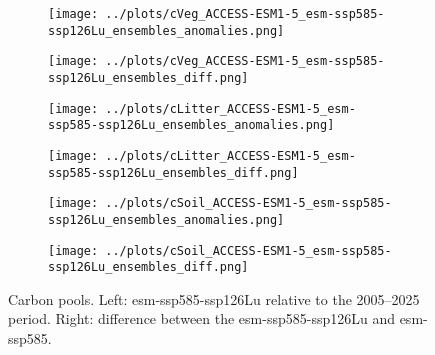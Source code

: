 \documentclass[]{article}
\begin{document}
\begin{figure}[H]
    \centering
    \begin{subfigure}[b]{0.4\linewidth}
        \texttt{[image: ../plots/cVeg\_ACCESS-ESM1-5\_esm-ssp585-ssp126Lu\_ensembles\_anomalies.png]}
    \end{subfigure}
    \begin{subfigure}[b]{0.4\linewidth}
        \texttt{[image: ../plots/cVeg\_ACCESS-ESM1-5\_esm-ssp585-ssp126Lu\_ensembles\_diff.png]}
    \end{subfigure}
    \begin{subfigure}[b]{0.4\linewidth}
        \texttt{[image: ../plots/cLitter\_ACCESS-ESM1-5\_esm-ssp585-ssp126Lu\_ensembles\_anomalies.png]}
    \end{subfigure}
    \begin{subfigure}[b]{0.4\linewidth}
        \texttt{[image: ../plots/cLitter\_ACCESS-ESM1-5\_esm-ssp585-ssp126Lu\_ensembles\_diff.png]}
    \end{subfigure}
    \begin{subfigure}[b]{0.4\linewidth}
        \texttt{[image: ../plots/cSoil\_ACCESS-ESM1-5\_esm-ssp585-ssp126Lu\_ensembles\_anomalies.png]}
    \end{subfigure}
    \begin{subfigure}[b]{0.4\linewidth}
        \texttt{[image: ../plots/cSoil\_ACCESS-ESM1-5\_esm-ssp585-ssp126Lu\_ensembles\_diff.png]}
    \end{subfigure}
    \caption{Carbon pools. Left: esm-ssp585-ssp126Lu relative to the 2005–2025 period. Right: difference between the esm-ssp585-ssp126Lu and esm-ssp585.}
    \label{fig:cpools}
\end{figure}
\end{document}
